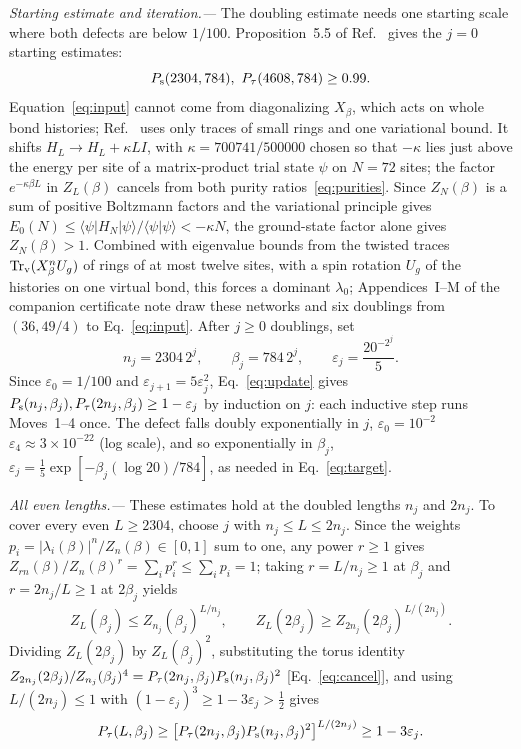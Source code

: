 \documentclass[aps,prl,reprint,amsmath,amssymb,nofootinbib,raggedbottom]{revtex4-2}
\begin{document}
\emph{Starting estimate and iteration.---}
The doubling estimate needs one starting scale where both defects are below
$1/100$. Proposition~5.5 of Ref.~\cite{source} gives the $j=0$ starting estimates:
\begin{equation}
 \Ps(2304,784),\ \Pt(4608,784)\ge0.99.
 \label{eq:input}
\end{equation}
Equation~\eqref{eq:input} cannot come from diagonalizing $X_\beta$, which acts
on whole bond histories; Ref.~\cite{source} uses only traces of small rings and
one variational bound. It shifts $H_L\to H_L+\kappa L I$, with
$\kappa=700741/500000$ chosen so that $-\kappa$ lies just above the energy per
site of a matrix-product trial state $\psi$ on $N=72$ sites; the factor
$e^{-\kappa\beta L}$ in $Z_L(\beta)$ cancels from both purity
ratios~\eqref{eq:purities}. Since $Z_N(\beta)$ is a sum of positive Boltzmann
factors and the variational principle gives
$E_0(N)\le\langle\psi|H_N|\psi\rangle/\langle\psi|\psi\rangle<-\kappa N$, the
ground-state factor alone gives $Z_N(\beta)>1$. Combined with eigenvalue bounds
from the twisted traces $\operatorname{Tr}_{\mathrm v}(X_\beta^nU_g)$ of rings of at most twelve
sites, with a spin rotation $U_g$ of the histories on one virtual bond, this
forces a dominant $\lambda_0$; Appendices~I--M of the companion
certificate note draw these networks and six doublings from $(36,49/4)$ to
Eq.~\eqref{eq:input}.
After $j\ge0$ doublings, set
\begin{equation}
 n_j=2304\,2^j,\qquad \beta_j=784\,2^j,\qquad
 \varepsilon_j=\frac{20^{-2^j}}5.
 \label{eq:scales}
\end{equation}
Since $\varepsilon_0=1/100$ and $\varepsilon_{j+1}=5\varepsilon_j^2$,
Eq.~\eqref{eq:update} gives
$P_{\mathrm s}(n_j,\beta_j),P_{\tau}(2n_j,\beta_j)\ge1-\varepsilon_j$ by induction on $j$:
each inductive step runs Moves~1--4 once.
The defect falls doubly exponentially in $j$,
$\varepsilon_0=10^{-2}$\,\,$\varepsilon_4\approx3\times10^{-22}$ (log scale),
and so exponentially in $\beta_j$,
$\varepsilon_j=\frac15\exp[-\beta_j(\log20)/784]$, as needed in Eq.~\eqref{eq:target}.

\emph{All even lengths.---}
These estimates hold at the doubled lengths $n_j$ and $2n_j$. To cover every
even $L\ge2304$, choose $j$ with $n_j\le L\le2n_j$. Since the weights
$p_i=|\lambda_i(\beta)|^n/Z_n(\beta)\in[0,1]$ sum to one, any power $r\ge1$
gives $Z_{rn}(\beta)/Z_n(\beta)^r=\sum_ip_i^r\le\sum_ip_i=1$; taking
$r=L/n_j\ge1$ at $\beta_j$ and $r=2n_j/L\ge1$ at $2\beta_j$ yields
\begin{equation}
 Z_L(\beta_j)\le Z_{n_j}(\beta_j)^{L/n_j},\qquad
 Z_L(2\beta_j)\ge Z_{2n_j}(2\beta_j)^{L/(2n_j)}.
 \label{eq:moments}
\end{equation}
Dividing $Z_L(2\beta_j)$ by $Z_L(\beta_j)^2$, substituting the torus identity
$Z_{2n_j}(2\beta_j)/Z_{n_j}(\beta_j)^4 = P_{\tau}(2n_j,\beta_j)P_{\mathrm s}(n_j,\beta_j)^2$
[Eq.~\eqref{eq:cancel}], and using $L/(2n_j)\le1$ with
$(1-\varepsilon_j)^3\ge1-3\varepsilon_j>\tfrac12$ gives
\begin{equation}
 P_{\tau}(L,\beta_j)
 \ge\bigl[P_{\tau}(2n_j,\beta_j)P_{\mathrm s}(n_j,\beta_j)^2\bigr]^{L/(2n_j)}
 \ge1-3\varepsilon_j.
 \label{eq:interpolate}
\end{equation}
\end{document}
